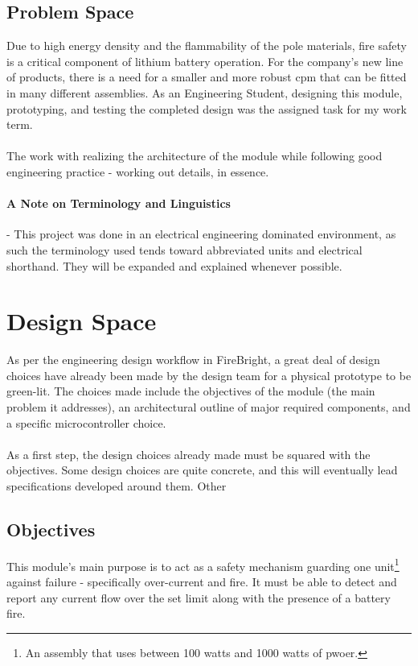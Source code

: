 \documentclass[12pt]{article}
\begin{document}
	\subsection{Problem Space}
	Due to high energy density and the flammability of the pole materials, fire safety is a critical component of lithium battery operation. For the company's new line of products, there is a need for a smaller and more robust \acrfull{cpm} that can be fitted in many different assemblies. As an Engineering Student, designing this module, prototyping, and testing the completed design was the assigned task for my work term.
	
    \paragraph{}
	The work with realizing the architecture of the module while following good engineering practice - working out details, in essence.

  \paragraph{A Note on Terminology and Linguistics} - This project was done in an electrical engineering dominated environment, as such the terminology used tends toward abbreviated units and electrical shorthand. They will be expanded and explained whenever possible.
  
  \section{Design Space}
  As per the engineering design workflow in FireBright, a great deal of design choices have already been made by the design team for a physical prototype to be green-lit. The choices made include the objectives of the module (the main problem it addresses), an architectural outline of major required components, and a specific microcontroller choice.

  \paragraph{}
  As a first step, the design choices already made must be squared with the objectives. Some design choices are quite concrete, and this will eventually lead specifications developed around them. Other

  \subsection{Objectives}
  This module's main purpose is to act as a safety mechanism guarding one unit\footnote{An assembly that uses between 100 watts and 1000 watts of pwoer.} against failure - specifically over-current and fire. It must be able to detect and report any current flow over the set limit along with the presence of a battery fire.
\end{document}
